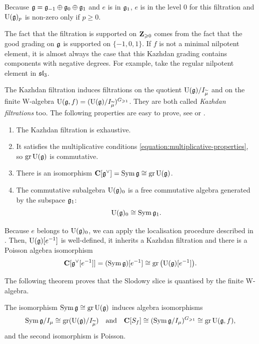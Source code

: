 Because $\g = \g_{-1} \oplus \g_0 \oplus \g_1$ and $e$ is in $\g_1$, $e$ is in the level $0$ for this filtration and $\U(\g)_p$ is non-zero only if $p \geqslant 0$. 

\begin{remark} \label{remark:nonnegative-filtration}
	The fact that the filtration is supported on $\Z_{\geqslant 0}$ comes from the fact that the good grading on $\g$ is supported on $\{-1, 0, 1\}$. If $f$ is not a minimal nilpotent element, it is almost always the case that this Kazhdan grading contains components with negative degrees. For example, take the regular nilpotent element in $\sl_3$.
\end{remark}

The Kazhdan filtration induces filtrations on the quotient $\U(\g) / I_{\widetilde{\mu}}$ and on the finite W-algebra $\U(\g, f) = (\U(\g) / I_{\widetilde{\mu}})^{G_{\geqslant 1}}$. They are both called \emph{Kazhdan filtrations} too. The following properties are easy to prove, see \cite{gan2002quantization} or \cite[Section 4.2.1]{juillard2025phd}.

\begin{lemma}
	\begin{enumerate}
		\item The Kazhdan filtration is exhaustive.
		
		\item It satisfies the multiplicative conditions \eqref{equation:multiplicative-properties}, so $\gr \U(\g)$ is commutative.
		
		\item There is an isomorphism $\C[\g^\vee] = \Sym \g \cong \gr \U(\g)$. 
		
		\item The commutative subalgebra $\U(\g)_0$ is a free commutative algebra generated by the subspace $\g_1$:
		\[ \U(\g)_0 \cong \Sym \g_1. \]
	\end{enumerate}
\end{lemma} 

Because $e$ belongs to $\U(\g)_0$, we can apply the localisation procedure described in . Then, $\U(\g)[e^{-1}]$ is well-defined, it inherits a Kazhdan filtration and there is a Poisson algebra isomorphism
\[ \C[\g^\vee[e^{-1}]] = (\Sym \g)[e^{-1}] \cong \gr \big(\U(\g)[e^{-1}]\big). \]

The following theorem proves that the Slodowy slice is quantised by the finite W-algebra.

\begin{theorem} \label{theorem:slodowy-quantisation}
	The isomorphism $\Sym \g \cong \gr \U(\g)$ induces algebra isomorphisms
	\[ \Sym \g / I_\mu \cong \gr(\U(\g) / I_{\widetilde{\mu}}) \quad \text{and} \quad \C[S_f] \cong (\Sym \g / I_\mu)^{G_{\geqslant 1}} \cong \gr \U(\g, f), \]
	and the second isomorphism is Poisson.
\end{theorem}



